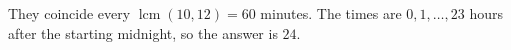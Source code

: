 They coincide every $\operatorname{lcm}(10,12)=60$ minutes. The times are $0,1,\ldots,23$ hours after the starting midnight, so the answer is $\boxed{24}$.
